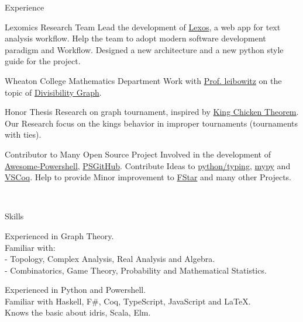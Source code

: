 \documentclass[]{resume-knyte}
\begin{document}
\begin{topic}{Experience}


    {Lexomics Research Team}
    {Lead the development of \href{https://github.com/WheatonCS/Lexos}{Lexos}, a web app for text analysis workflow.
    Help the team to adopt modern software development paradigm and Workflow.
    Designed a new architecture and a new python style guide for the project.}

    {Wheaton College Mathematics Department}
    {Work with \href{https://wheatoncollege.edu/academics/faculty-directory/rochelle-shelly-leibowitz/}{Prof. leibowitz}
    on the topic of \href{https://chantisnake.github.io/2016/05/22/explain-the-divisibility-graph/}{Divisibility Graph}.}

    {Honor Thesis}
    {Research on graph tournament, inspired by \href{https://www.maa.org/sites/default/files/pdf/upload_library/22/Allendoerfer/1981/0025570x.di021114.02p00982.pdf}{King Chicken Theorem}.
    Our Research focus on the kings behavior in improper tournaments (tournaments with ties).}


    {Contributor to Many Open Source Project}
    {Involved in the development of \href{https://github.com/janikvonrotz/awesome-powershell}{Awesome-Powershell}, \href{https://github.com/pcgeek86/PSGitHub}{PSGitHub}.
    Contribute Ideas to \href{https://github.com/python/typing}{python/typing}, \href{https://github.com/python/mypy}{mypy} and \href{https://github.com/siegebell/vscoq}{VSCoq}.
    Help to provide Minor improvement to \href{https://github.com/FStarLang/FStar}{FStar} and many other Projects.}

\\ %
\end{topic}



\begin{topic}{Skills}


    {Experienced in Graph Theory.\\
    Familiar with:\\
    - Topology, Complex Analysis, Real Analysis and Algebra.\\
    - Combinatorics, Game Theory, Probability and Mathematical Statistics.}

    {Experienced in Python and Powershell.\\
    Familiar with Haskell, F\#, Coq, TypeScript, JavaScript and \LaTeX{}.\\
    Knows the basic about idris, Scala, Elm.}


    \\ %
\end{topic}
\end{document}
